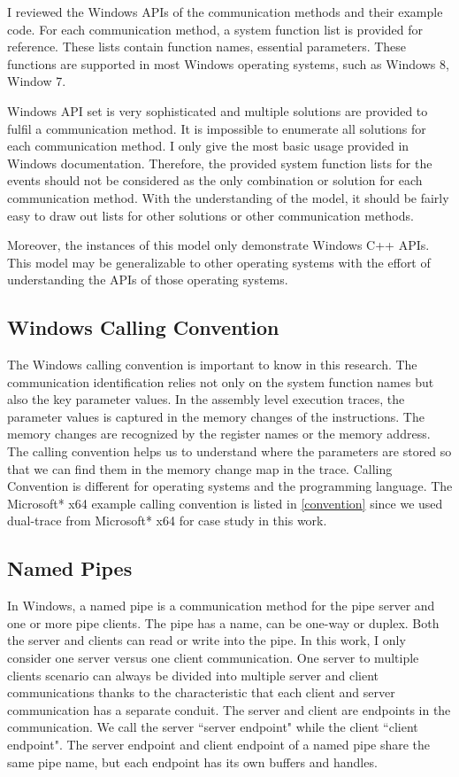 I reviewed the Windows APIs of the communication methods and their example code. For each communication method, a system function list is provided for reference. These lists contain function names, essential parameters. These functions are supported in most Windows operating systems, such as Windows 8, Window 7. 

Windows API set is very sophisticated and multiple solutions are provided to fulfil a communication method. It is impossible to enumerate all solutions for each communication method. I only give the most basic usage provided in Windows documentation. Therefore, the provided system function lists for the events should not be considered as the only combination or solution for each communication method. With the understanding of the model, it should be fairly easy to draw out lists for other solutions or other communication methods. 

Moreover, the instances of this model only demonstrate Windows C++ APIs. This model may be generalizable to other operating systems with the effort of understanding the APIs of those operating systems.

\subsection{Windows Calling Convention}
The Windows calling convention is important to know in this research. The communication identification relies not only on the system function names but also the key parameter values. In the assembly level execution traces, the parameter values is captured in the memory changes of the instructions. The memory changes are recognized by the register names or the memory address. The calling convention helps us to understand where the parameters are stored so that we can find them in the memory change map in the trace. Calling Convention is different for operating systems and the programming language. The Microsoft* x64 example calling convention is listed in \ref{convention} since we used dual-trace from Microsoft* x64 for case study in this work.

\subsection{Named Pipes}
In Windows, a named pipe is a communication method for the pipe server and one or more pipe clients. The pipe has a name, can be one-way or duplex. Both the server and clients can read or write into the pipe.\cite{WinNamedpipe} In this work, I only consider one server versus one client communication. One server to multiple clients scenario can always be divided into multiple server and client communications thanks to the characteristic that each client and server communication has a separate conduit. The server and client are endpoints in the communication. We call the server ``server endpoint" while the client ``client endpoint".  The server endpoint and client endpoint of a named pipe share the same pipe name, but each endpoint has its own buffers and handles. 

